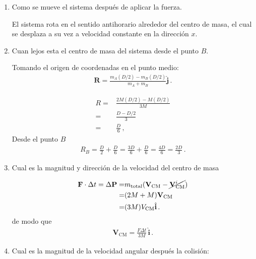   \begin{enumerate}
  \item Como se mueve el sistema después de aplicar la fuerza.

El sistema rota en el sentido antihorario alrededor del centro de masa, el cual se desplaza a su vez a velocidad constante en la dirección $x$.
\item Cuan lejos esta el centro de masa del sistema desde el punto $B$.

Tomando el origen de coordenadas en el punto medio:
\begin{align}
\mathbf{R}=\frac{m_A(D/2)-m_B(D/2)}{m_A+m_B}\hat{\mathbf{j}}\,.  
\end{align}

\begin{align}
R=&\frac{2M(D/2)-M(D/2)}{3M}\nonumber\\
=&\frac{D-D/2}{3}\nonumber\\
=&\frac{D}{6}\,,
\end{align}
Desde el punto $B$
\begin{align}
  R_B=\frac{D}{2}+\frac{D}{6}=\frac{3D}{6}+\frac{D}{6}=\frac{4D}{6}=\frac{2D}{3}\,.
\end{align}
\item Cual es la magnitud y dirección de la velocidad del centro de masa

  \begin{align}
    \mathbf{F}\cdot \Delta t=\Delta \mathbf{P}=&m_{\text{total}}(\mathbf{V}_{\text{CM}}-\cancel{\mathbf{V}_{\text{CM}}^i})\nonumber\\
    =&(2M+M)\mathbf{V}_{\text{CM}}\nonumber\\
    =&(3M)V_{\text{CM}}\hat{\mathbf{i}}\,.
  \end{align}
de modo que
\begin{align}
  \label{eq:6}
  \mathbf{V}_{\text{CM}}=\frac{F\Delta t}{3M}\,\hat{\mathbf{i}}\,.
\end{align}
\item Cual es la magnitud de la velocidad angular después la colisión:


\end{enumerate}
